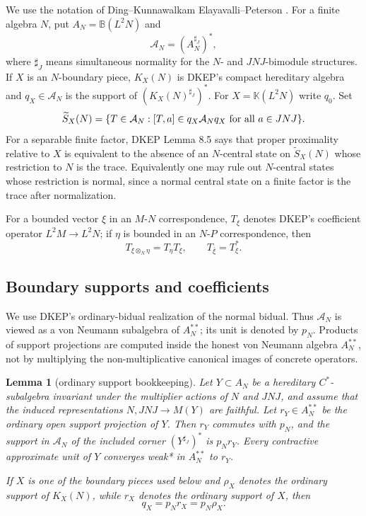 \documentclass[12pt]{article}
\newtheorem{lemma}{Lemma}
\newcommand{\cA}{\mathcal A}
\begin{document}
We use the notation of Ding--Kunnawalkam Elayavalli--Peterson \cite{DKEP}.
For a finite algebra \(N\), put \(A_N=\mathbb B(L^2N)\) and
\[
        \cA_N=(A_N^{\sharp_J})^*,
\]
where \(\sharp_J\) means simultaneous normality for the \(N\)- and
\(JNJ\)-bimodule structures.  If \(X\) is an \(N\)-boundary piece, \(K_X(N)\)
is DKEP's compact hereditary algebra and \(q_X\in\cA_N\) is the support of
\((K_X(N)^{\sharp_J})^*\).  For \(X=\mathbb K(L^2N)\) write \(q_0\).  Set
\[
 \widetilde S_X(N)=\{T\in\cA_N:[T,a]\in q_X\cA_Nq_X\hbox{ for all }
 a\in JNJ\}.
\]
For a separable finite factor, DKEP Lemma 8.5 says that proper proximality
relative to \(X\) is equivalent to the absence of an \(N\)-central state on
\(\widetilde S_X(N)\) whose restriction to \(N\) is the trace.  Equivalently
one may rule out \(N\)-central states whose restriction is normal, since a
normal central state on a finite factor is the trace after normalization.

For a bounded vector \(\xi\) in an \(M\)-\(N\) correspondence, \(T_\xi\) denotes
DKEP's coefficient operator \(L^2M\to L^2N\); if \(\eta\) is bounded in an
\(N\)-\(P\) correspondence, then
\[
        T_{\xi\otimes_N\eta}=T_\eta T_\xi,\qquad
        T_{\bar\xi}=T_\xi^* .                                    \tag{1}
\]

\subsection*{Boundary supports and coefficients}

We use DKEP's ordinary-bidual realization of the normal bidual.  Thus
\(\cA_N\) is viewed as a von Neumann subalgebra of \(A_N^{**}\); its unit is
denoted by \(p_N\).  Products of support projections are computed inside the
honest von Neumann algebra \(A_N^{**}\), not by multiplying the
non-multiplicative canonical images of concrete operators.

\begin{lemma}[ordinary support bookkeeping]\label{lem:support}
Let \(Y\subset A_N\) be a hereditary \(C^*\)-subalgebra invariant under the
multiplier actions of \(N\) and \(JNJ\), and assume that the induced
representations \(N,JNJ\to M(Y)\) are faithful.  Let \(r_Y\in A_N^{**}\) be
the ordinary open support projection of \(Y\).  Then \(r_Y\) commutes with
\(p_N\), and the support in \(\cA_N\) of the included corner
\((Y^{\sharp_J})^*\) is \(p_Nr_Y\).  Every contractive approximate unit of
\(Y\) converges weak* in \(A_N^{**}\) to \(r_Y\).

If \(X\) is one of the boundary pieces used below and \(\rho_X\) denotes the
ordinary support of \(K_X(N)\), while \(r_X\) denotes the ordinary support of
\(X\), then
\[
        q_X=p_Nr_X=p_N\rho_X .                                    \tag{2}
\]
\end{lemma}
\end{document}
